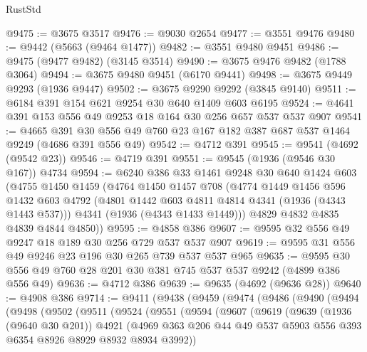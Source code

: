 \begin{lexlean}{RustStd}
\begin{coremodule}
@9475 := @3675 @3517
@9476 := @9030 @2654
@9477 := @3551 @9476
@9480 := @9442 (@5663 (@9464 @1477))
@9482 := @3551 @9480 @9451
@9486 := @9475 (@9477 @9482) (@3145 @3514)
@9490 := @3675 @9476 @9482 (@1788 @3064)
@9494 := @3675 @9480 @9451 (@6170 @9441)
@9498 := @3675 @9449 @9293 (@1936 @9447)
@9502 := @3675 @9290 @9292 (@3845 @9140)
@9511 := @6184 @391 @154 @621 @9254 @30 @640 @1409 @603 @6195
@9524 := @4641 @391 @153 @556 @49 @9253 @18 @164 @30 @256 @657 @537 @537 @907
@9541 := @4665 @391 @30 @556 @49 @760 @23 @167 @182 @387 @687 @537 @1464 @9249 (@4686 @391 @556 @49)
@9542 := @4712 @391
@9545 := @9541 (@4692 (@9542 @23))
@9546 := @4719 @391
@9551 := @9545 (@1936 (@9546 @30 @167)) @4734
@9594 := @6240
    @386
    @33
    @1461
    @9248
    @30
    @640
    @1424
    @603
    (@4755
      @1450
      @1459
      (@4764
        @1450
        @1457
        @708
        (@4774
          @1449
          @1456
          @596
          @1432
          @603
          @4792
          (@4801 @1442 @603 @4811 @4814 @4341 (@1936 (@4343 @1443 @537)))
          @4341
          (@1936 (@4343 @1433 @1449)))
        @4829
        @4832
        @4835
        @4839
        @4844
        @4850))
@9595 := @4858 @386
@9607 := @9595 @32 @556 @49 @9247 @18 @189 @30 @256 @729 @537 @537 @907
@9619 := @9595 @31 @556 @49 @9246 @23 @196 @30 @265 @739 @537 @537 @965
@9635 := @9595 @30 @556 @49 @760 @28 @201 @30 @381 @745 @537 @537 @9242 (@4899 @386 @556 @49)
@9636 := @4712 @386
@9639 := @9635 (@4692 (@9636 @28))
@9640 := @4908 @386
@9714 := @9411
    (@9438
      (@9459
        (@9474
          (@9486
            (@9490
              (@9494
                (@9498
                  (@9502
                    (@9511
                      (@9524
                        (@9551
                          (@9594
                            (@9607
                              (@9619
                                (@9639
                                  (@1936 (@9640 @30 @201))
                                  @4921
                                  (@4969
                                    @363
                                    @206
                                    @44
                                    @49
                                    @537
                                    @5903
                                    @556
                                    @393
                                    @6354
                                    @8926
                                    @8929
                                    @8932
                                    @8934
                                    @3992))

\end{coremodule}
\end{lexlean}
